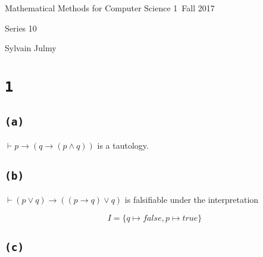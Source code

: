 \documentclass[a4paper,11pt]{report}
\author{Sylvain Julmy}
\date{\today}
\begin{document}
\begin{center}
  \Large{
    Mathematical Methods for Computer Science 1\
    Fall 2017
  }
  \noindent\makebox[\linewidth]{\rule{\linewidth}{0.4pt}}

  Series 10
  \vspace*{1.4cm}

  Sylvain Julmy
  
  \noindent\makebox[\linewidth]{\rule{\linewidth}{0.4pt}}
\end{center}

\section*{\texttt{1}}

\subsection*{\texttt{(a)}}

\begin{prooftree}
\end{prooftree}

$\vdash p \to (q \to (p \wedge q))$ is a tautology.

\subsection*{\texttt{(b)}}

\begin{prooftree}
\end{prooftree}

$\vdash (p \vee q) \to ((p \to q) \vee q)$ is falsifiable under the
interpretation

\[
  I = \{
  q \mapsto false,
  p \mapsto true
  \}
\]

\subsection*{\texttt{(c)}}

\begin{prooftree}
\end{prooftree}
\end{document}
